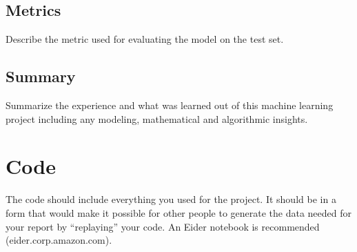 \documentclass{exam}
\begin{document}
\subsection{Metrics}
Describe the metric used for evaluating the model on the test set.

\subsection{Summary}
Summarize the experience and what was learned out of this machine learning project including any modeling, mathematical and algorithmic insights.

\section{Code}
The code should include everything you used for the project. It should be in a form that would make it possible for other people to generate the data needed for your report by “replaying” your code. An Eider notebook is recommended (eider.corp.amazon.com).
\end{document}
